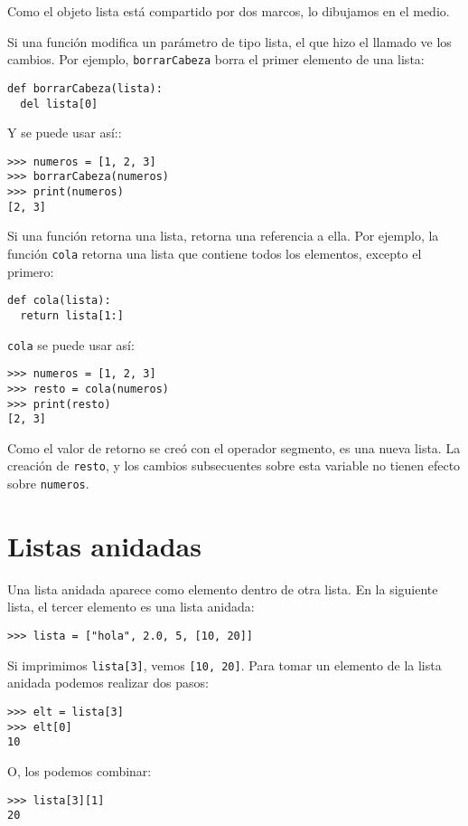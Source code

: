 Como el objeto lista está compartido por dos marcos, lo dibujamos
en el medio.

Si una función modifica un parámetro de tipo lista, el que hizo el
llamado ve los cambios. Por ejemplo, \texttt{borrarCabeza} borra el
primer elemento de una lista:
\begin{lstlisting}
def borrarCabeza(lista):
  del lista[0]
\end{lstlisting}

Y se puede usar así::
\begin{lstlisting}
>>> numeros = [1, 2, 3]
>>> borrarCabeza(numeros)
>>> print(numeros)
[2, 3]
\end{lstlisting}

Si una función retorna una lista, retorna una referencia a ella. Por
ejemplo, la función \texttt{cola} retorna una lista que contiene todos
los elementos, excepto el primero:
\begin{lstlisting}
def cola(lista):
  return lista[1:]
\end{lstlisting}

\texttt{cola} se puede usar así:
\begin{lstlisting}
>>> numeros = [1, 2, 3]
>>> resto = cola(numeros)
>>> print(resto)
[2, 3]
\end{lstlisting}

Como el valor de retorno se creó con el operador segmento, es una
nueva lista. La creación de \texttt{resto}, y los cambios subsecuentes
sobre esta variable no tienen efecto sobre \texttt{numeros}.

\section{Listas anidadas}

\label{nested lists}  

Una lista anidada aparece como elemento dentro de otra lista. En la
siguiente lista, el tercer elemento es una lista anidada:
\begin{lstlisting}
>>> lista = ["hola", 2.0, 5, [10, 20]]
\end{lstlisting}

Si imprimimos \texttt{lista{[}3{]}}, vemos \texttt{{[}10, 20{]}}.
Para tomar un elemento de la lista anidada podemos realizar dos pasos:
\begin{lstlisting}
>>> elt = lista[3]
>>> elt[0]
10
\end{lstlisting}
 O, los podemos combinar:
\begin{lstlisting}
>>> lista[3][1]
20
\end{lstlisting}

